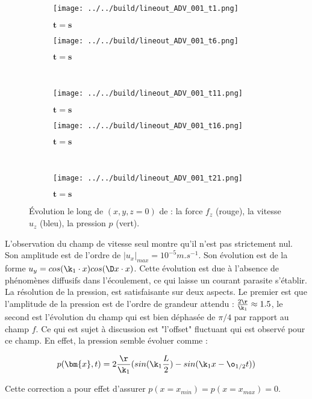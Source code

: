\begin{figure}
\begin{center}
	\begin{subfigure}[t]{0.4\textwidth}                                                                                                                                   
		\texttt{[image: ../../build/lineout\_ADV\_001\_t1.png]}
		\caption{ $\bm{t=s}$}
		\label{fig : 001_t1}
	\end{subfigure}\hfill
	\begin{subfigure}[t]{0.4\textwidth}
		\texttt{[image: ../../build/lineout\_ADV\_001\_t6.png]}
		\caption{ $\bm{t=s}$}
		\label{fig : 001_t6}
	\end{subfigure}
\\
	\begin{subfigure}[t]{0.4\textwidth}
		\texttt{[image: ../../build/lineout\_ADV\_001\_t11.png]}
		\caption{ $\bm{t=s}$}
		\label{fig : 001_t11}
	\end{subfigure}\hfill
	\begin{subfigure}[t]{0.4\textwidth}
		\texttt{[image: ../../build/lineout\_ADV\_001\_t16.png]}
		\caption{ $\bm{t=s}$}
		\label{fig : 001_t16}
	\end{subfigure}
\\
	\begin{subfigure}[t]{0.4\textwidth}
		\texttt{[image: ../../build/lineout\_ADV\_001\_t21.png]}
		\caption{ $\bm{t=s}$}
		\label{fig : 001_t21}
	\end{subfigure}	
\end{center}
\caption{Évolution le long de $(x,y,z=0)$ de : la force $f_z$ (rouge), la vitesse $u_z$ (bleu), la pression $p$ (vert).}
\label{fig : 001}
\end{figure}


L'observation du champ de vitesse seul montre qu'il n'est pas strictement nul. Son amplitude est de l'ordre de $|u_x|_{max}=10^{-5} m.s^{-1}$. Son évolution est de la forme $u_y = cos(\k_1 \cdot x)cos(\D x \cdot x)$. Cette évolution est due à l'absence de phénomènes diffusifs dans l'écoulement, ce qui laisse un courant parasite s'établir. La résolution de la pression, est satisfaisante sur deux aspects. Le premier est que l'amplitude de la pression est de l'ordre de grandeur attendu : $\frac{2\r}{\k_1}\approx 1.5$, le second est l'évolution du champ qui est bien déphasée de $\pi/4$ par rapport au champ $f$. Ce qui est sujet à discussion est "l'offset" fluctuant qui est observé pour ce champ. En effet, la pression semble évoluer comme :

\begin{align}
p(\bm{x},t) = 2 \frac{\r}{\k_1} (sin(\k_1 \frac{L}{2})- sin(\k_1 x - \o_{1/2} t) )
\end{align}

Cette correction a pour effet d'assurer $p(x=x_{min}) = p(x=x_{max}) = 0$.
